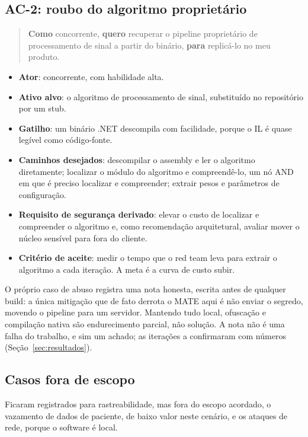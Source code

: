 \subsection{AC-2: roubo do algoritmo proprietário}

\begin{quote}
\textbf{Como} concorrente, \textbf{quero} recuperar o pipeline proprietário de processamento de sinal a partir do binário, \textbf{para} replicá-lo no meu produto.
\end{quote}

\begin{itemize}
\item \textbf{Ator}: concorrente, com habilidade alta.
\item \textbf{Ativo alvo}: o algoritmo de processamento de sinal, substituído no repositório por um stub.
\item \textbf{Gatilho}: um binário .NET descompila com facilidade, porque o IL é quase legível como código-fonte.
\item \textbf{Caminhos desejados}: descompilar o assembly e ler o algoritmo diretamente; localizar o módulo do algoritmo e compreendê-lo, um nó AND em que é preciso localizar e compreender; extrair pesos e parâmetros de configuração.
\item \textbf{Requisito de segurança derivado}: elevar o custo de localizar e compreender o algoritmo e, como recomendação arquitetural, avaliar mover o núcleo sensível para fora do cliente.
\item \textbf{Critério de aceite}: medir o tempo que o red team leva para extrair o algoritmo a cada iteração. A meta é a curva de custo subir.
\end{itemize}

O próprio caso de abuso registra uma nota honesta, escrita antes de qualquer build: a única mitigação que de fato derrota o MATE aqui é não enviar o segredo, movendo o pipeline para um servidor. Mantendo tudo local, ofuscação e compilação nativa são endurecimento parcial, não solução. A nota não é uma falha do trabalho, e sim um achado; as iterações a confirmaram com números (Seção~\ref{sec:resultados}).

\subsection{Casos fora de escopo}

Ficaram registrados para rastreabilidade, mas fora do escopo acordado, o vazamento de dados de paciente, de baixo valor neste cenário, e os ataques de rede, porque o software é local.
